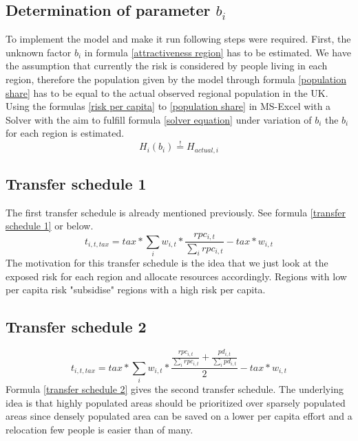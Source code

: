 \documentclass[10pt,a4]{article}
\begin{document}
\subsection{Determination of parameter $b_i$}
To implement the model and make it run following steps were required.
First, the unknown factor $b_i$ in formula \ref{attractiveness region} has to be estimated. We have the assumption that currently the risk is considered by people living in each region, therefore the population given by the model through formula \ref{population share} has to be equal to the actual observed regional population in the UK. Using the formulas \ref{risk per capita} to \ref{population share} in MS-Excel with a Solver with the aim to fulfill formula \ref{solver equation} under variation of $b_i$ the $b_i$ for each region is estimated.
\begin{equation}
    H_i(b_i) \stackrel{!}{=}  H_{actual,i}
    \label{solver equation}
\end{equation}

\subsection{Transfer schedule 1}
The first transfer schedule is already mentioned previously. See formula \ref{transfer schedule 1} or below.
\begin{equation}
    t_{i,t,tax} = tax * \sum_i w_{i,t} * \frac{rpc_{i,t}}{\sum_i rpc_{i,t}} - tax * w_{i,t}
    \label{transfer schedule 1 again}
\end{equation}
The motivation for this transfer schedule is the idea that we just look at the exposed risk for each region and allocate resources accordingly. Regions with low per capita risk "subsidise" regions with a high risk per capita.

\subsection{Transfer schedule 2}

\begin{equation}
    t_{i,t,tax} = tax * \sum_i w_{i,t} * \frac{\frac{rpc_{i,t}}{\sum_i rpc_{i,t}} + \frac{pd_{i,t}}{\sum_i pd_{i,t}}}{2} - tax * w_{i,t}
    \label{transfer schedule 2}
\end{equation}
Formula \ref{transfer schedule 2} gives the second transfer schedule. The underlying idea is that highly populated areas should be prioritized over sparsely populated areas since densely populated area can be saved on a lower per capita effort and a relocation few people is easier than of many.
\end{document}
